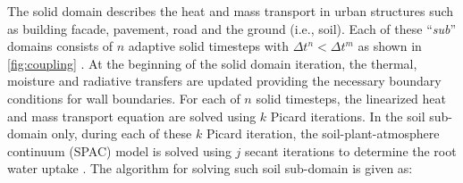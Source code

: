 The solid domain describes the heat and mass transport in urban structures such as building facade, pavement, road and the ground (i.e., soil). Each of these ``\textit{sub}'' domains consists of $n$ adaptive solid timesteps with $\Delta t^n < \Delta t^m$ as shown in \cref{fig:coupling} \citep{Kubilay2018,Janssen2002}. At the beginning of the solid domain iteration, the thermal, moisture and radiative transfers are updated providing the necessary boundary conditions for wall boundaries. For each of $n$ solid timesteps, the linearized heat and mass transport equation are solved using $k$ Picard iterations. In the soil sub-domain only, during each of these $k$ Picard iteration, the soil-plant-atmosphere continuum (SPAC) model is solved using $j$ secant iterations to determine the root water uptake \citep{Manoli2014}. The algorithm for solving such soil sub-domain is given as:
